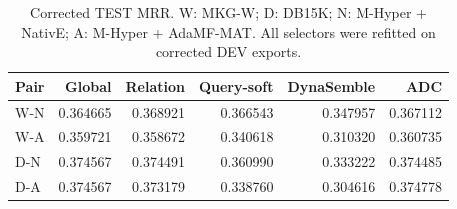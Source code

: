 \begin{table}[htbp]
\centering\small
\caption{Corrected TEST MRR. W: MKG-W; D: DB15K; N: M-Hyper + NativE; A: M-Hyper + AdaMF-MAT. All selectors were refitted on corrected DEV exports.}
\label{tab:rerun-main}
\begin{tabular}{lrrrrr}
\toprule
Pair & Global & Relation & Query-soft & DynaSemble & ADC\\
\midrule
W-N & 0.364665 & 0.368921 & 0.366543 & 0.347957 & 0.367112\\
W-A & 0.359721 & 0.358672 & 0.340618 & 0.310320 & 0.360735\\
D-N & 0.374567 & 0.374491 & 0.360990 & 0.333222 & 0.374485\\
D-A & 0.374567 & 0.373179 & 0.338760 & 0.304616 & 0.374778\\
\bottomrule
\end{tabular}
\end{table}
